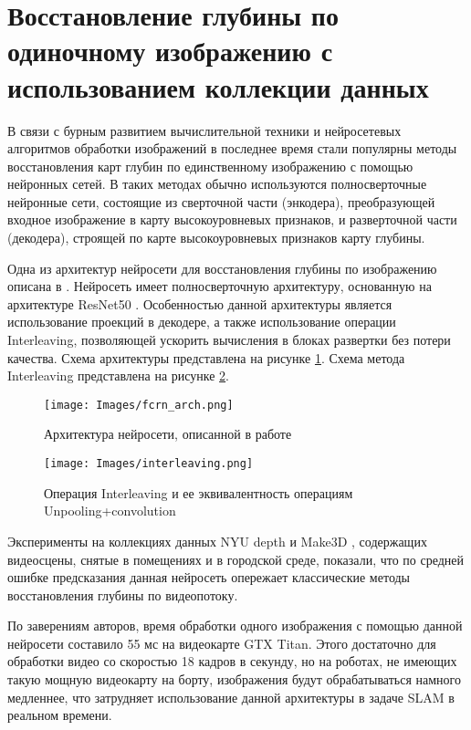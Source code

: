 \documentclass{mipt-thesis-bs}
\begin{document}
\section{Восстановление глубины по одиночному изображению с использованием коллекции данных}
В связи с бурным развитием вычислительной техники и нейросетевых алгоритмов обработки изображений в последнее время стали популярны методы восстановления карт глубин по единственному изображению с помощью нейронных сетей. В таких методах обычно используются полносверточные нейронные сети, состоящие из сверточной части (энкодера), преобразующей входное изображение в карту высокоуровневых признаков, и разверточной части (декодера), строящей по карте высокоуровневых признаков карту глубины.

Одна из архитектур нейросети для восстановления глубины по изображению описана в \cite{laina2016deeper}. Нейросеть имеет полносверточную архитектуру, основанную на архитектуре ResNet50 \cite{he2016deep}. Особенностью данной архитектуры является использование проекций в декодере, а также использование операции Interleaving, позволяющей ускорить вычисления в блоках развертки без потери качества. Схема архитектуры представлена на рисунке \ref{figurefcrn}. Схема метода Interleaving представлена на рисунке \ref{figureinterleaving}.

\begin{figure}
	\centering
	\texttt{[image: Images/fcrn\_arch.png]}
	\caption{Архитектура нейросети, описанной в работе \cite{laina2016deeper}}
	\label{figurefcrn}
\end{figure}

\begin{figure}
	\centering
	\texttt{[image: Images/interleaving.png]}\\
	\caption{Операция Interleaving и ее эквивалентность операциям Unpooling+convolution}
	\label{figureinterleaving}
\end{figure}

Эксперименты на коллекциях данных NYU depth \cite{silberman2011indoor} и Make3D \cite{ashutosh2009make3d}, содержащих видеосцены, снятые в помещениях и в городской среде, показали, что по средней ошибке предсказания данная нейросеть опережает классические методы восстановления глубины по видеопотоку.

По заверениям авторов, время обработки одного изображения с помощью данной нейросети составило 55 мс на видеокарте GTX Titan. Этого достаточно для обработки видео со скоростью 18 кадров в секунду, но на роботах, не имеющих такую мощную видеокарту на борту, изображения будут обрабатываться намного медленнее, что затрудняет использование данной архитектуры в задаче SLAM в реальном времени.
\end{document}
